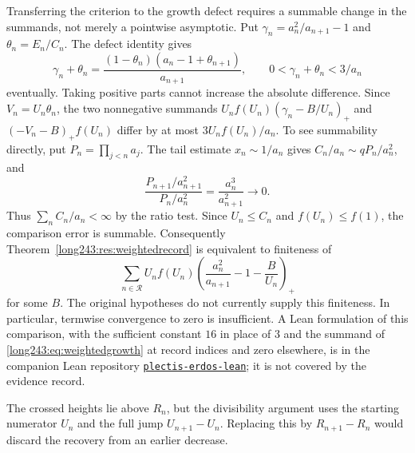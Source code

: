 Transferring the criterion to the growth defect requires a summable
change in the summands, not merely a pointwise asymptotic. Put
$\gamma_n=a_n^2/a_{n+1}-1$ and $\theta_n=E_n/C_n$. The defect identity gives
\[
 \gamma_n+\theta_n=
 \frac{(1-\theta_n)(a_n-1+\theta_{n+1})}{a_{n+1}},
 \qquad 0<\gamma_n+\theta_n<3/a_n
\]
eventually. Taking positive parts cannot increase the absolute difference.
Since $V_n=U_n\theta_n$, the two nonnegative summands
$U_nf(U_n)(\gamma_n-B/U_n)_+$ and $(-V_n-B)_+f(U_n)$ differ by at most
$3U_nf(U_n)/a_n$. To see summability directly, put $P_n=\prod_{j<n}a_j$.
The tail estimate $x_n\sim1/a_n$ gives $C_n/a_n\sim qP_n/a_n^2$, and
\[
 \frac{P_{n+1}/a_{n+1}^{2}}{P_n/a_n^{2}}
 =\frac{a_n^3}{a_{n+1}^{2}}\longrightarrow0.
\]
Thus $\sum_n C_n/a_n<\infty$ by the ratio test. Since $U_n\le C_n$ and
$f(U_n)\le f(1)$, the comparison error is summable.
Consequently Theorem~\ref{long243:res:weightedrecord} is equivalent to finiteness of
\begin{equation}\label{long243:eq:weightedgrowth}
 \sum_{n\in\mathcal R}U_nf(U_n)
 \left(\frac{a_n^2}{a_{n+1}}-1-\frac B{U_n}\right)_+
\end{equation}
for some $B$. The original hypotheses do not currently supply this
finiteness. In particular, termwise convergence to zero is insufficient.
A Lean formulation of this comparison, with the sufficient constant $16$
in place of $3$ and the summand of \eqref{long243:eq:weightedgrowth} at
record indices and zero elsewhere, is in the companion Lean repository
\href{https://github.com/wcook04/plectis-erdos-lean/blob/52f29ad173b04e3bac941b3663f2b9aebe5de0bb/ErdosProblems/Erdos243/PaperCompleteR8/GrowthDebtSummability.lean\#L234}{\texttt{plectis-erdos-lean}};
it is not covered by the evidence record.

The crossed heights lie above $R_n$, but the divisibility argument uses
the starting numerator $U_n$ and the full jump $U_{n+1}-U_n$. Replacing
this by $R_{n+1}-R_n$ would discard the recovery from an earlier decrease.


